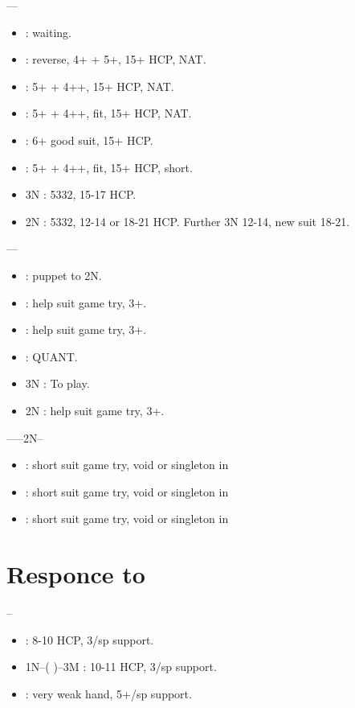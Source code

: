 \documentclass[12pt,twoside,a5paper]{report}%
\begin{document}
	----
	\begin{itemize}
	\renewcommand{\labelitemi}{}
	\item {} : waiting.
	\item {} : reverse, 4+\sp{} + 5+\he{}, 15+ HCP, NAT.
	\item {} : 5+\he{} + 4+\cl{}+, 15+ HCP, NAT.
	\item {} : 5+\he{} + 4+\di{}+, fit, 15+ HCP, NAT.
	\item {} : 6+\he{} good suit, 15+ HCP.
	\item {} : 5+\he{} + 4+\di{}+, fit, 15+ HCP, short\sp{}.
	\item 3N : 5332, 15-17 HCP.
	\item 2N : 5332, 12-14 or 18-21 HCP. Further 3N 12-14, new suit 18-21.
	\end{itemize}

	----
	\begin{itemize}
	\renewcommand{\labelitemi}{}
	\item {} : puppet to 2N.
	\item {} : help suit game try, 3+\cl{}.
	\item {} : help suit game try, 3+\di{}.
	\item {} : QUANT.
	\item 3N : To play.
	\item 2N : help suit game try, 3+\sp{}. 
	\end{itemize}

	------2N--
	\begin{itemize}
	\renewcommand{\labelitemi}{}
	\item {} : short suit game try, void or singleton in \cl{}
	\item {} : short suit game try, void or singleton in \di{}
	\item {} : short suit game try, void or singleton in \sp{}
	\end{itemize}

	\chapter*{Responce to }
	-- \\
	\begin{itemize}
	\renewcommand{\labelitemi}{}
	\item {} : 8-10 HCP, 3/sp{} support.
	\item 1N--( )--3M : 10-11 HCP, 3/sp{} support.
	\item {} : very weak hand, 5+/sp{} support.
	\end{itemize}
\end{document}
